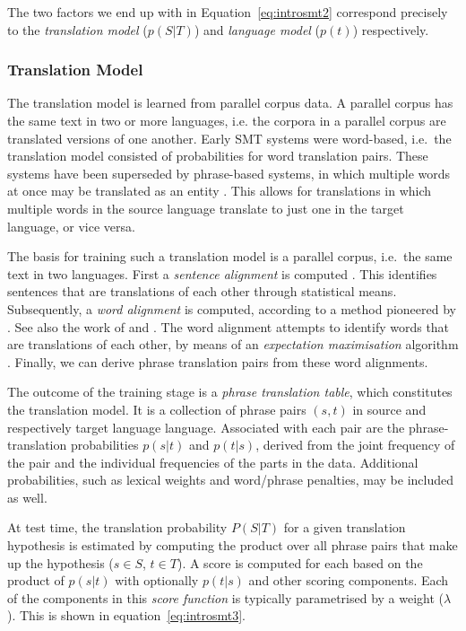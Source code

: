 The two factors we end up with in Equation~\ref{eq:introsmt2} correspond
precisely to the \emph{translation model} ($p(S|T)$) and \emph{language model}
($p(t)$) respectively.

\subsubsection{Translation Model}

The translation model is learned from parallel corpus data. A parallel corpus
has the same text in two or more languages, i.e. the corpora in a parallel corpus are translated versions of one another. Early SMT systems were word-based, i.e.\ the translation model
consisted of probabilities for word translation pairs. These systems have been
superseded by phrase-based systems, in which multiple words at once may be
translated as an entity \citep{PBSMT}. This allows for translations in which
multiple words in the source language translate to just one in the target
language, or vice versa.

The basis for training such a translation model is a parallel corpus, i.e.\ the
same text in two languages. First a \emph{sentence alignment} is computed
\citep{TIEDEMANN}. This identifies sentences that are translations of each other
through statistical means. Subsequently, a \emph{word alignment} is computed,
according to a method pioneered by \cite{BROWN}. See also the work of
\cite{OchNey2003} and \cite{TIEDEMANN}. The word alignment attempts to
identify words that are translations of each other, by means of an
\emph{expectation maximisation} algorithm \citep{EXPMAX}. Finally, we can derive phrase
translation pairs from these word alignments.

The outcome of the training stage is a \emph{phrase translation table}, which
constitutes the translation model. It is a collection of phrase pairs $(s,t)$
in source and respectively target language language. Associated with each pair
are the phrase-translation probabilities $p(s|t)$ and $p(t|s)$, derived from
the joint frequency of the pair and the individual frequencies of the parts in
the data. Additional probabilities, such as lexical weights and word/phrase
penalties, may be included as well.

At test time, the translation probability $P(S|T)$ for a given translation
hypothesis is estimated by computing the product over all phrase pairs that
make up the hypothesis ($s \in S$, $t \in T$). A score is computed for each
based on the product of $p(s|t)$ with optionally $p(t|s)$ and other scoring
components. Each of the components in this \emph{score function}
is typically parametrised by a weight ($\lambda$). This is shown in equation~\ref{eq:introsmt3}.

